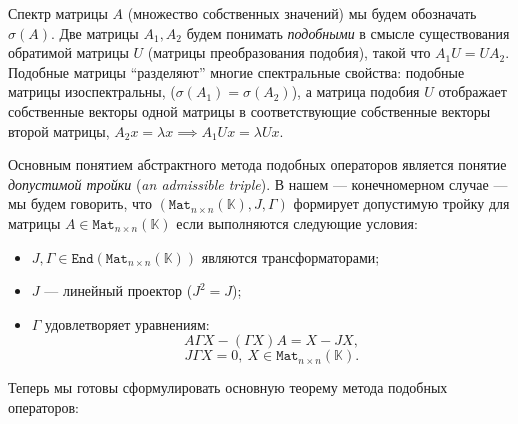 \documentclass[14pt,a4paper]{extarticle}
\theoremstyle{definition}
\begin{document}
Спектр матрицы \( A \)
    (множество собственных значений)
    мы будем обозначать \( \sigma(A) \).
Две матрицы \( A_1, A_2 \) будем понимать \emph{подобными}
    в смысле существования обратимой матрицы \( U \)
    (матрицы преобразования подобия),
    такой что \( A_1 U = U A_2 \).
Подобные матрицы ``разделяют'' многие спектральные свойства:
    подобные матрицы изоспектральны, (\( \sigma(A_1) = \sigma(A_2) \)),
    а матрица подобия \( U \) отображает собственные векторы одной матрицы
    в соответствующие собственные векторы второй матрицы,
    \( A_2 x = \lambda x \implies A_1 U x = \lambda U x \).

Основным понятием абстрактного метода подобных операторов
явл\-яется понятие \emph{допустимой тройки} (\emph{an admissible triple}).
В нашем --- конечно\-мерном случае --- мы будем говорить, что
    \( (\mathtt{Mat}_{n{\times}n}(\mathbb{K}), J, \Gamma) \)
    формирует допустимую тройку
    для матрицы \( A\in\mathtt{Mat}_{n{\times}n}(\mathbb{K}) \)
    если вы\-полняются следующие условия:
\begin{itemize}
    \item \( J, \Gamma \in \mathtt{End}(\mathtt{Mat}_{n{\times}n}(\mathbb{K})) \)
      являются транс\-форм\-аторами;
    \item \( J \) --- линейный проектор (\( J^2 = J \));
    \item  \( \Gamma \) удовле\-творяет уравнениям:
        \[
            A \Gamma X - (\Gamma X) A = X - JX,
        \]
        \[
            J\Gamma X = 0,\ X\in\mathtt{Mat}_{n{\times}n}(\mathbb{K}).
        \]
\end{itemize}

Теперь мы готовы сформулировать основную теорему метода подобных операторов:
\end{document}
